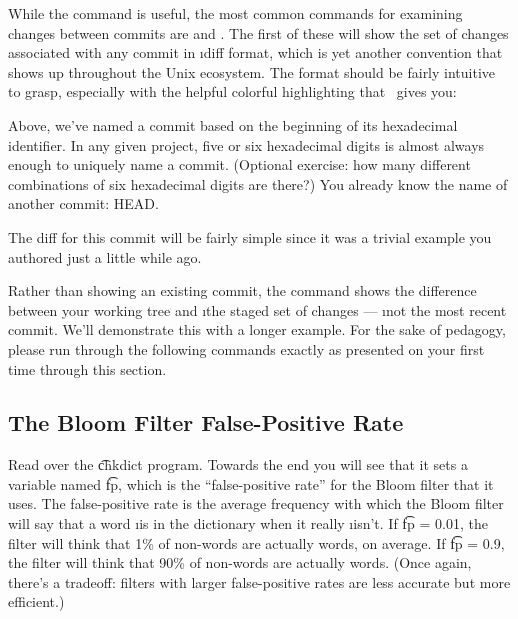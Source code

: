 \documentclass[letterpaper, 12pt, titlepage, twoside]{article}
\begin{document}
While the  command is useful, the most common commands for
examining changes between commits are  and . The first of
these will show the set of changes associated with any commit in \i{diff
  format}, which is yet another convention that shows up throughout the Unix
ecosystem. The format should be fairly intuitive to grasp, especially with the
helpful colorful highlighting that \git\ gives you:


Above, we've named a commit based on the beginning of its hexadecimal
identifier. In any given project, five or six hexadecimal digits is almost
always enough to uniquely name a commit. (Optional exercise: how many
different combinations of six hexadecimal digits are there?) You already know
the name of another commit: HEAD.


The diff for this commit will be fairly simple since it was a trivial example
you authored just a little while ago.


Rather than showing an existing commit, the  command shows the
difference between your working tree and \i{the staged set of changes} ---
\i{not} the most recent commit. We'll demonstrate this with a longer example.
For the sake of pedagogy, please run through the following commands exactly as
presented on your first time through this section.

\subsection*{The Bloom Filter False-Positive Rate}

Read over the \t{chkdict} program. Towards the end you will see that it sets a
variable named \t{fp}, which is the ``false-positive rate'' for the Bloom
filter that it uses. The false-positive rate is the average frequency with
which the Bloom filter will say that a word \i{is} in the dictionary when it
really \i{isn't}. If \t{fp = 0.01}, the filter will think that 1\% of
non-words are actually words, on average. If \t{fp = 0.9}, the filter will
think that 90\% of non-words are actually words. (Once again, there's a
tradeoff: filters with larger false-positive rates are less accurate but more
efficient.)
\end{document}

